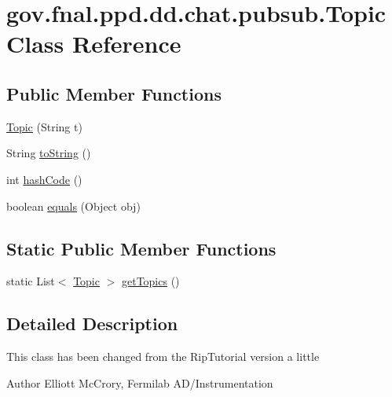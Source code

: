 \hypertarget{classgov_1_1fnal_1_1ppd_1_1dd_1_1chat_1_1pubsub_1_1Topic}{\section{gov.\-fnal.\-ppd.\-dd.\-chat.\-pubsub.\-Topic Class Reference}
\label{classgov_1_1fnal_1_1ppd_1_1dd_1_1chat_1_1pubsub_1_1Topic}
}
\subsection*{Public Member Functions}
\begin{DoxyCompactItemize}
\item 
\hyperlink{classgov_1_1fnal_1_1ppd_1_1dd_1_1chat_1_1pubsub_1_1Topic_ab0ad39ea46e3eeada862f434b5558f1a}{Topic} (String t)
\item 
String \hyperlink{classgov_1_1fnal_1_1ppd_1_1dd_1_1chat_1_1pubsub_1_1Topic_abf0ec67d8669ff8f15efb85091d2c7a5}{to\-String} ()
\item 
int \hyperlink{classgov_1_1fnal_1_1ppd_1_1dd_1_1chat_1_1pubsub_1_1Topic_a20034552c12479df8ef65b38371193cd}{hash\-Code} ()
\item 
boolean \hyperlink{classgov_1_1fnal_1_1ppd_1_1dd_1_1chat_1_1pubsub_1_1Topic_a4d8aecad8c58d2c136d42f66d4c147c3}{equals} (Object obj)
\end{DoxyCompactItemize}
\subsection*{Static Public Member Functions}
\begin{DoxyCompactItemize}
\item 
static List$<$ \hyperlink{classgov_1_1fnal_1_1ppd_1_1dd_1_1chat_1_1pubsub_1_1Topic}{Topic} $>$ \hyperlink{classgov_1_1fnal_1_1ppd_1_1dd_1_1chat_1_1pubsub_1_1Topic_acc4d2063c84bace9d53a017fcdbad2e9}{get\-Topics} ()
\end{DoxyCompactItemize}


\subsection{Detailed Description}
This class has been changed from the Rip\-Tutorial version a little

\begin{DoxyAuthor}{Author}
Elliott Mc\-Crory, Fermilab A\-D/\-Instrumentation 
\end{DoxyAuthor}


